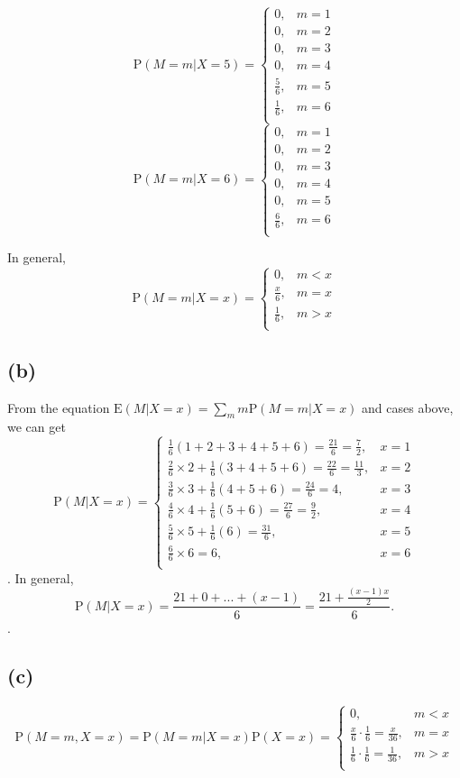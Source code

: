 \documentclass{article}
\begin{document}
\[
\text{P}(M = m | X=5) = 
\begin{cases}
0, & m = 1\\
0, & m = 2\\
0, & m = 3\\
0, & m = 4\\
\frac{5}{6}, & m = 5\\
\frac{1}{6}, & m = 6\\
\end{cases}
\]
\[
\text{P}(M = m | X=6) = 
\begin{cases}
0, & m = 1\\
0, & m = 2\\
0, & m = 3\\
0, & m = 4\\
0, & m = 5\\
\frac{6}{6}, & m = 6\\
\end{cases}
\]

In general, 
\[
\text{P}(M = m | X=x) = 
\begin{cases}
0, & m < x\\
\frac{x}{6}, & m = x\\
\frac{1}{6}, & m > x\\
\end{cases}
\]

\subsection*{(b)}
From the equation $\text{E} (M|X=x) = \sum_{m}m\text{P}(M=m|X=x)$ and cases above, we can get 
\[
\text{P}(M | X=x) = 
\begin{cases}
\frac{1}{6}(1+2+3+4+5+6) = \frac{21}{6} = \frac{7}{2}, & x = 1\\
\frac{2}{6} \times 2+\frac{1}{6}(3+4+5+6) = \frac{22}{6} = \frac{11}{3}, & x = 2\\
\frac{3}{6} \times 3+\frac{1}{6}(4+5+6) = \frac{24}{6} = 4, & x = 3\\
\frac{4}{6} \times 4+\frac{1}{6}(5+6) = \frac{27}{6} = \frac{9}{2}, & x = 4\\
\frac{5}{6} \times 5+\frac{1}{6}(6) = \frac{31}{6}, & x = 5\\
\frac{6}{6} \times 6 = 6, & x = 6\\
\end{cases}
\].
In general, 
\[
\text{P}(M | X=x) = \frac{21+0+...+(x-1)}{6} =  \frac{21+\frac{(x-1)x}{2}}{6}.
\].

\subsection*{(c)}
\[
\text{P}(M = m, X=x) = \text{P}(M = m | X=x)\text{P}(X=x) = 
\begin{cases}
0, & m < x\\
\frac{x}{6} \cdot \frac{1}{6} = \frac{x}{36}, & m = x\\
\frac{1}{6} \cdot \frac{1}{6} = \frac{1}{36}, & m > x\\
\end{cases}
\]
\end{document}

